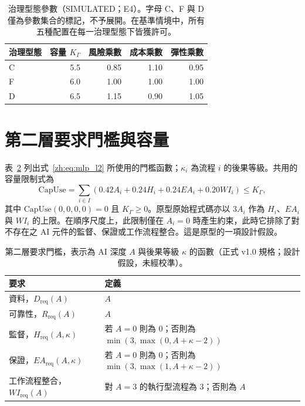 \begin{table}[tbp]
\centering
\caption{治理型態參數（SIMULATED；E4）。字母 C、F 與 D 僅為參數集合的標記，不予展開。在基準情境中，所有五種配置在每一治理型態下皆獲許可。}
\label{zh:tab:app_regimes}
\footnotesize
\begin{tabular}{lrrrr}
\toprule
治理型態 & 容量 $K_\Gamma$ & 風險乘數 & 成本乘數 & 彈性乘數 \\
\midrule
C & 5.5 & 0.85 & 1.10 & 0.95 \\
F & 6.0 & 1.00 & 1.00 & 1.00 \\
D & 6.5 & 1.15 & 0.90 & 1.05 \\
\bottomrule
\end{tabular}
\end{table}

\section{第二層要求門檻與容量}

表~\ref{zh:tab:app_thresholds} 列出式~\eqref{zh:eq:mlp_l2} 所使用的門檻函數；$\kappa_i$ 為流程 $i$ 的後果等級。共用的容量限制式為
\begin{equation}
\mathrm{CapUse}=\sum_{i\in I}\left(0.42A_i+0.24H_i+0.24EA_i+0.20WI_i\right)\leq K_\Gamma ,
\label{zh:eq:app_capacity}
\end{equation}
其中 $\mathrm{CapUse}(0,0,0,0)=0$ 且 $K_\Gamma\geq0$。原型原始程式碼亦以 $3A_i$ 作為 $H_i$、$EA_i$ 與 $WI_i$ 的上限。在順序尺度上，此限制僅在 $A_i=0$ 時產生約束，此時它排除了對不存在之 AI 元件的監督、保證或工作流程整合。這是原型的一項設計假設。

\begin{table}[tbp]
\centering
\caption{第二層要求門檻，表示為 AI 深度 $A$ 與後果等級 $\kappa$ 的函數（正式 v1.0 規格；設計假設，未經校準）。}
\label{zh:tab:app_thresholds}
\footnotesize
\begin{tabular}{ll}
\toprule
要求 & 定義 \\
\midrule
資料，$D_{\mathrm{req}}(A)$ & $A$ \\
可靠性，$R_{\mathrm{req}}(A)$ & $A$ \\
監督，$H_{\mathrm{req}}(A,\kappa)$ & 若 $A=0$ 則為 $0$；否則為 $\min(3,\max(0,A+\kappa-2))$ \\
保證，$EA_{\mathrm{req}}(A,\kappa)$ & 若 $A=0$ 則為 $0$；否則為 $\min(3,\max(1,A+\kappa-2))$ \\
工作流程整合，$WI_{\mathrm{req}}(A)$ & 對 $A=3$ 的執行型流程為 $3$；否則為 $A$ \\
\bottomrule
\end{tabular}
\end{table}

